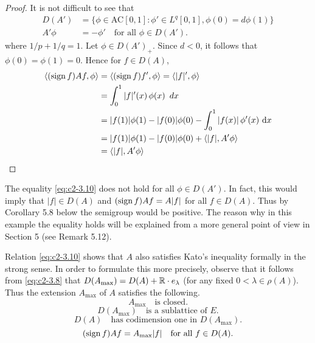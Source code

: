 \begin{proof}
It is not difficult to see that
\begin{equation}\label{eq:c2-3.11}
\begin{array}{rl}
D(A') &= \{\phi \in \text{AC}[0,1] : \phi' \in L^{q}[0,1], \phi(0) = d\phi(1)\}\\ 
A'\phi &= -\phi' \quad \text{for all } \phi \in D(A').
\end{array}
\end{equation}
where $1/p + 1/q = 1$. Let $\phi \in D(A')_{+}$. 
Since $d < 0$, it follows that $\phi(0) = \phi(1) = 0$. 
Hence for $f \in D(A)$,
\begin{align*}
\langle(\operatorname{sign}  f)Af,\phi\rangle &= \langle(\operatorname{sign}  f)f',\phi\rangle = \langle|f|',\phi\rangle\\
&= \int_{0}^{1} |f|'(x) \, \phi(x) \,\ dx\\
&= |f(1)|\phi(1) - |f(0)|\phi(0) - \int_{0}^{1} |f(x)| \, \phi'(x) \, \mathop{}\!\mathrm{d}{x}\\
&= |f(1)|\phi(1) - |f(0)|\phi(0) + \langle|f|,A'\phi\rangle\\
&= \langle|f|,A'\phi\rangle
\end{align*}
\end{proof}

\begin{remark}\label{rem:c2-3.15}
The equality \eqref{eq:c2-3.10} does not hold for all $\phi \in D(A')$. 
In fact, this would imply that $|f| \in D(A)$ and $(\operatorname{sign}  f)Af = A|f|$ for
all $f \in D(A)$. 
Thus by Corollary  5.8 
below the semigroup would be positive. 
The reason why in this example the equality holds will be explained from a more general point of view in Section 5 (see
Remark 5.12).
\end{remark}

Relation \eqref{eq:c2-3.10} shows that $A$ also satisfies Kato's inequality
formally in the strong sense. 
In order to formulate this more precisely, observe that it follows from \eqref{eq:c2-3.8} that $D(A_{\max}) = D(A) + \mathbb{R} \cdot e_{\lambda}$ (for any fixed $0 < \lambda \in \rho(A)$). Thus the extension $A_{\max}$ of $A$ satisfies the following.
\begin{equation}\label{eq:c2-3.12}
A_{\max} \quad \text{is closed}.
\end{equation}
\begin{equation}\label{eq:c2-3.13}
D(A_{\max}) \quad \text{is a sublattice of } E.
\end{equation}
\begin{equation}\label{eq:c2-3.14}
D(A) \quad \text{has codimension one in } D(A_{\max}).
\end{equation}
\begin{equation}\label{eq:c2-3.15}
(\operatorname{sign}  f)Af = A_{\max}|f| \quad \text{for all } f \in D(A).
\end{equation}

